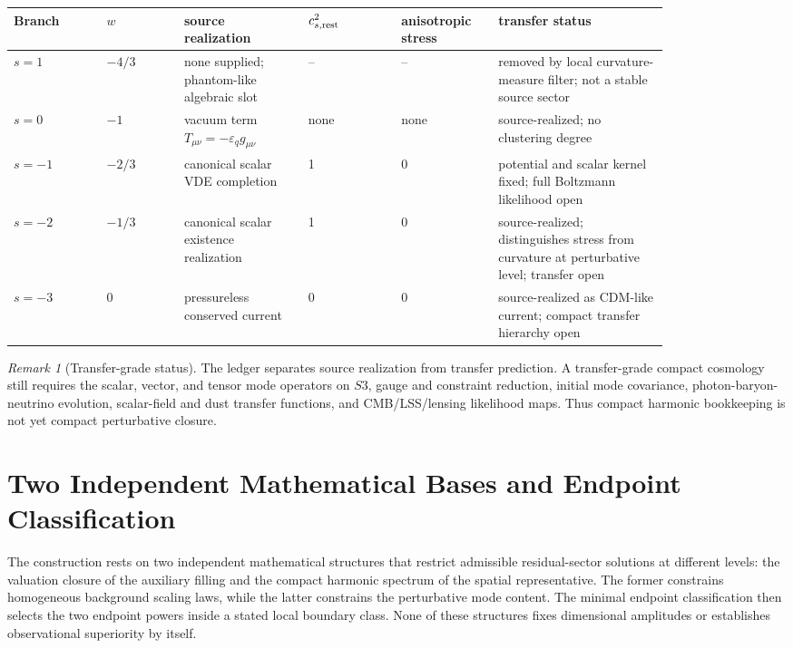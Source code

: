 \documentclass[11pt,a4paper]{article}
\def\Sthree{S3}%
\numberwithin{equation}{section}
\theoremstyle{definition}
\theoremstyle{plain}
\theoremstyle{remark}
\newtheorem{remark}[criterion]{Remark}
\newcommand{\Sthree}{S^3}
\begin{document}
\begin{center}
\small
\begin{tabular}{@{}p{0.12\linewidth}p{0.10\linewidth}p{0.16\linewidth}p{0.12\linewidth}p{0.12\linewidth}p{0.22\linewidth}@{}}
\toprule
Branch & \(w\) & source realization & \(c_{s,\rm rest}^2\) & anisotropic stress & transfer status \\
\midrule
\(s=1\) & \(-4/3\) & none supplied; phantom-like algebraic slot & -- & -- & removed by local curvature-measure filter; not a stable source sector \\
\(s=0\) & \(-1\) & vacuum term \(T_{\mu\nu}=-\varepsilon_qg_{\mu\nu}\) & none & none & source-realized; no clustering degree \\
\(s=-1\) & \(-2/3\) & canonical scalar VDE completion & 1 & 0 & potential and scalar kernel fixed; full Boltzmann likelihood open \\
\(s=-2\) & \(-1/3\) & canonical scalar existence realization & 1 & 0 & source-realized; distinguishes stress from curvature at perturbative level; transfer open \\
\(s=-3\) & 0 & pressureless conserved current & 0 & 0 & source-realized as CDM-like current; compact transfer hierarchy open \\
\bottomrule
\end{tabular}
\end{center}

\begin{remark}[Transfer-grade status]
The ledger separates source realization from transfer prediction. A transfer-grade compact cosmology still requires the scalar, vector, and tensor mode operators on \(\Sthree\), gauge and constraint reduction, initial mode covariance, photon-baryon-neutrino evolution, scalar-field and dust transfer functions, and CMB/LSS/lensing likelihood maps. Thus compact harmonic bookkeeping is not yet compact perturbative closure.
\end{remark}


\section{Two Independent Mathematical Bases and Endpoint Classification}
The construction rests on two independent mathematical structures that restrict admissible residual-sector solutions at different levels: the valuation closure of the auxiliary filling and the compact harmonic spectrum of the spatial representative. The former constrains homogeneous background scaling laws, while the latter constrains the perturbative mode content. The minimal endpoint classification then selects the two endpoint powers inside a stated local boundary class. None of these structures fixes dimensional amplitudes or establishes observational superiority by itself.
\end{document}
